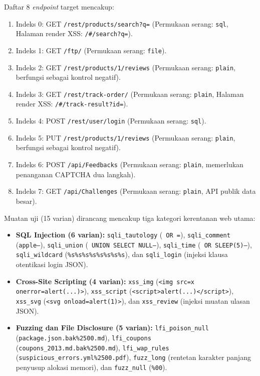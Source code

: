 Daftar 8 \textit{endpoint} target mencakup:
\begin{enumerate}
    \item Indeks 0: GET \texttt{/rest/products/search?q=} (Permukaan serang: \texttt{sql}, Halaman render XSS: \texttt{/\#/search?q=}).
    \item Indeks 1: GET \texttt{/ftp/} (Permukaan serang: \texttt{file}).
    \item Indeks 2: GET \texttt{/rest/products/1/reviews} (Permukaan serang: \texttt{plain}, berfungsi sebagai kontrol negatif).
    \item Indeks 3: GET \texttt{/rest/track-order/} (Permukaan serang: \texttt{plain}, Halaman render XSS: \texttt{/\#/track-result?id=}).
    \item Indeks 4: POST \texttt{/rest/user/login} (Permukaan serang: \texttt{sql}).
    \item Indeks 5: PUT \texttt{/rest/products/1/reviews} (Permukaan serang: \texttt{plain}, berfungsi sebagai kontrol negatif).
    \item Indeks 6: POST \texttt{/api/Feedbacks} (Permukaan serang: \texttt{plain}, memerlukan penanganan CAPTCHA dua langkah).
    \item Indeks 7: GET \texttt{/api/Challenges} (Permukaan serang: \texttt{plain}, API publik data besar).
\end{enumerate}

Muatan uji (15 varian) dirancang mencakup tiga kategori kerentanan web utama:
\begin{itemize}
    \item \textbf{SQL Injection (6 varian):} \texttt{sqli\_tautology} (\texttt{\textquotesingle\ OR \textquotesingle =}), \texttt{sqli\_comment} (\texttt{apple\textquotesingle --}), \texttt{sqli\_union} (\texttt{\textquotesingle\ UNION SELECT NULL--}), \texttt{sqli\_time} (\texttt{\textquotesingle\ OR SLEEP(5)--}), \texttt{sqli\_wildcard} (\texttt{\%s\%s\%s\%s\%s\%s\%s\%s}), dan \texttt{sqli\_login} (injeksi klausa otentikasi login JSON).
    \item \textbf{Cross-Site Scripting (4 varian):} \texttt{xss\_img} (\texttt{<img src=x onerror=alert(...)>}), \texttt{xss\_script} (\texttt{<script>alert(...)</script>}), \texttt{xss\_svg} (\texttt{<svg onload=alert(1)>}), dan \texttt{xss\_review} (injeksi muatan ulasan JSON).
    \item \textbf{Fuzzing dan File Disclosure (5 varian):} \texttt{lfi\_poison\_null} (\texttt{package.json.bak\%2500.md}), \texttt{lfi\_coupons} (\texttt{coupons\_2013.md.bak\%2500.md}), \texttt{lfi\_wap\_rules} (\texttt{suspicious\_errors.yml\%2500.pdf}), \texttt{fuzz\_long} (rentetan karakter panjang penyusup alokasi memori), dan \texttt{fuzz\_null} (\texttt{\%00}).
\end{itemize}

